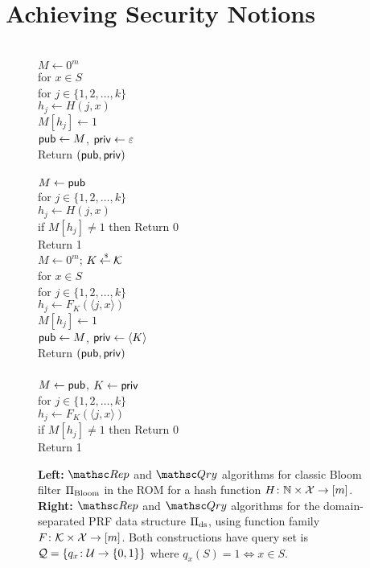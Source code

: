 \section{Achieving Security Notions}



\begin{figure}[tp]
\centering
{}
{
\\
$M \gets 0^m$\\
for $x \in S$\\
\nudge for $j \in \{1,2,\ldots,k\}$\\
\nudge\nudge $h_j \gets H(j,x)$\\
\nudge\nudge $M[h_j] \gets 1$\\
${\sf pub} \gets M$, ${\sf priv} \gets \varepsilon$\\
Return $({\sf pub},{\sf priv})$\\

\medskip
{}\\
$M\gets{\sf pub}$\\
for $j \in \{1,2,\ldots,k\}$\\
\nudge $h_j \gets H(j,x)$\\
\nudge if $M[h_j] \neq 1$ then Return 0\\
Return 1
}
{
\\
$M \gets 0^m$; $K {\:\stackrel{{\scriptscriptstyle \hspace{0.2em}\$}} {\leftarrow}\:} {\cal K}$\\
for $x \in S$\\
\nudge for $j \in \{1,2,\ldots,k\}$\\
\nudge\nudge $h_j \gets F_{K}(\langle j,x \rangle) $\\
\nudge\nudge $M[h_j] \gets 1$\\
${\sf pub} \gets M$, ${\sf priv} \gets \langle K \rangle$\\
Return $({\sf pub},{\sf priv})$\\

\medskip
{}\\
$M\gets{\sf pub}$, $K \gets {\sf priv}$\\
for $j \in \{1,2,\ldots,k\}$\\
\nudge $h_j \gets F_{K}(\langle j,x \rangle) $\\
\nudge if $M[h_j] \neq 1$ then Return 0\\
Return 1
}
\caption{{\bf Left:} $\Rep$ and $\Qry$ algorithms for classic Bloom
  filter $\Pi_{\mathrm{Bloom}}$ in the ROM for a hash function $H\colon \mathbb{N} \times
  {\cal X} \to [m]$. {\bf Right:} $\Rep$ and $\Qry$
  algorithms for the domain-separated PRF data structure
  $\Pi_{\mathrm{ds}}$, using function family $F \colon
  {\cal K} \times {\cal X} \to [m]$.  Both constructions have query set is ${\cal Q}=\{q_x\colon
  {\cal U} \to \{0,1\}\}$ where $q_x(S)=1 \Leftrightarrow x \in S$.  }
\label{fig:bf-and-lin}
\end{figure}

